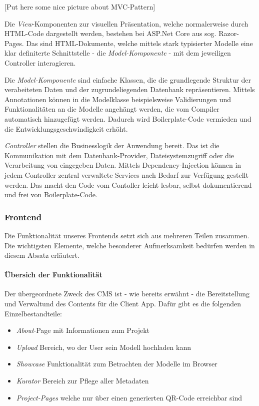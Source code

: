 \documentclass[titlepage, a4paper, 11pt]{scrartcl}
\begin{document}
        [Put here some nice picture about MVC-Pattern]
        
        Die \textit{View}-Komponenten zur visuellen Präsentation, welche normalerweise durch HTML-Code dargestellt werden, bestehen bei ASP.Net Core aus sog. Razor-Pages.
        Das sind HTML-Dokumente, welche mittels stark typisierter Modelle eine klar definiterte Schnittstelle - die \textit{Model-Komponente} - mit dem jeweiligen Controller interagieren.

        Die \textit{Model-Komponente} sind einfache Klassen, die die grundlegende Struktur der verabeiteten Daten und der zugrundeliegenden Datenbank repräsentieren.
        Mittels Annotationen können in die Modelklasse beispielsweise Validierungen und Funktionalitäten an die Modelle angehängt werden, die vom Compiler automatisch hinzugefügt werden.
        Dadurch wird Boilerplate-Code vermieden und die Entwicklungsgeschwindigkeit erhöht.

        \textit{Controller} stellen die Businesslogik der Anwendung bereit. Das ist die Kommunikation mit dem Datenbank-Provider, Dateisystemzugriff oder die Verarbeitung von eingegeben Daten.
        Mittels Dependency-Injection können in jedem Controller zentral verwaltete Services nach Bedarf zur Verfügung gestellt werden. Das macht den Code vom Contoller leicht lesbar, selbst dokumentierend
        und frei von Boilerplate-Code.

      \subsubsection{Frontend}

        Die Funktionalität unseres Frontends setzt sich aus mehreren Teilen zusammen. Die wichtigsten Elemente, welche besonderer Aufmerksamkeit bedürfen werden in diesem Absatz erläutert.

        \paragraph{Übersich der Funktionalität}

          Der übergeordnete Zweck des CMS ist - wie bereits erwähnt - die Bereitstellung und Verwaltund des Contents für die Client App. Dafür gibt es die folgenden Einzelbestandteile:

          \begin{itemize}
            \item \textit{About}-Page mit Informationen zum Projekt
            \item \textit{Upload} Bereich, wo der User sein Modell hochladen kann
            \item \textit{Showcase} Funktionalität zum Betrachten der Modelle im Browser
            \item \textit{Kurator} Bereich zur Pflege aller Metadaten
            \item \textit{Project-Pages} welche nur über einen generierten QR-Code erreichbar sind
          \end{itemize}
          
\end{document}
